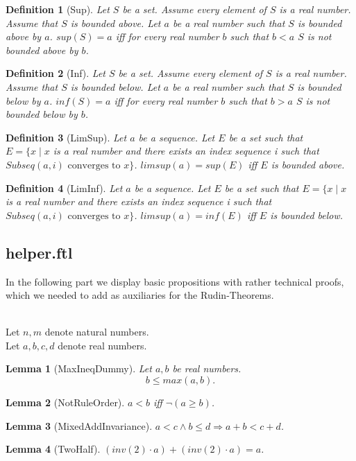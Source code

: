 \documentclass{article}
\newenvironment{forthel}{\begin{leftbar}}{\end{leftbar}}
\newtheorem{lemma}{Lemma}
\newtheorem{definition}{Definition}
\begin{document}
\begin{forthel}
	\begin{definition}[Sup] 
		Let $S$ be a set. Assume every element of $S$ is a real number. 
		Assume that $S$ is bounded above. Let $a$ be a real number such that $S$ is bounded above by $a$. 
		$sup(S) = a$ iff for every real number $b$ such that $b < a$ $S$ is not bounded above by $b$.
	\end{definition}
	
	\begin{definition}[Inf]
		Let $S$ be a set. Assume every element of $S$ is a real number. 
		Assume that $S$ is bounded below. Let $a$ be a real number such that $S$ is bounded below by $a$. 
		$inf(S) = a$ iff for every real number $b$ such that $b > a$ $S$ is not bounded below by $b$.
	\end{definition}
	
	\begin{definition}[LimSup]
		Let $a$ be a sequence. Let $E$ be a set such that \\$E = \{ x \mid x $ is a real number and there exists an index sequence i such that $ Subseq(a,i) \text{ converges to } x \}$. $limsup(a) = sup(E)$ iff $E$ is bounded above.
	\end{definition}
	
	\begin{definition}[LimInf]
		Let $a$ be a sequence. Let $E$ be a set such that $E = \{ x \mid x $ is a real number and there exists an index sequence i such that $ Subseq(a,i) \text{ converges to } x \}$. $limsup(a) = inf(E)$ iff $E$ is bounded below.
	\end{definition}
\end{forthel}

\subsection{helper.ftl}
In the following part we display basic propositions with rather technical proofs, which we needed to add as auxiliaries for the Rudin-Theorems.

\begin{forthel}
	\\
	Let $n,m$ denote natural numbers.\\
	Let $a,b,c,d$ denote real numbers.
	
	
	
	\begin{lemma}[MaxIneqDummy]
	Let $a,b$ be real numbers. $$b \leq max(a,b).$$
	\end{lemma}
	
	\begin{lemma}[NotRuleOrder]
	$a < b$ iff $\neg(a \geq b)$.
	\end{lemma}
	
	\begin{lemma}[MixedAddInvariance]
	$a < c \wedge b \leq d \Rightarrow a + b < c + d$.
	\end{lemma}
	
	\begin{lemma}[TwoHalf]
	$(inv(2) \cdot a) + (inv(2) \cdot a) = a$.
	\end{lemma}
	
\end{forthel}
\end{document}
